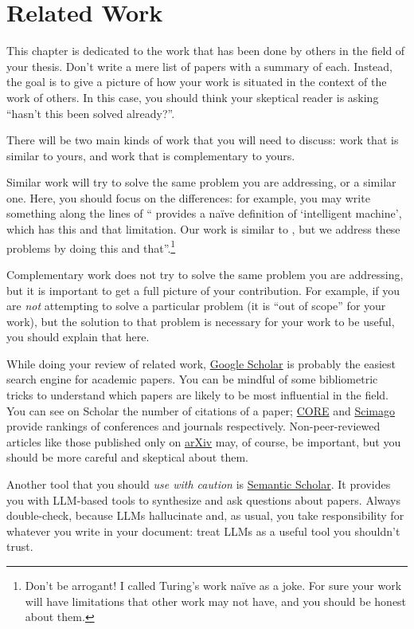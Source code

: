 \chapter{Related Work}
\label{sec:related}

This chapter is dedicated to the work that has been done by others in the field of your thesis.
Don't write a mere list of papers with a summary of each. Instead, the goal is to give a picture
of how your work is situated in the context of the work of others. In this case, you should
think your skeptical reader is asking ``hasn't this been solved already?''.

There will be two main kinds of work that you will need to discuss: work that is similar
to yours, and work that is complementary to yours.

Similar work will try to solve the same problem you are addressing, or a similar one.
Here, you should focus on the differences: for example, you may write something along the
lines of ``\textcite{DBLP:journals/x/Turing50} provides a naïve definition of
`intelligent machine', which has this and that limitation. Our work is similar to
\citeauthor{DBLP:journals/x/Turing50}, but we address these problems by doing this and
that''.\footnote{Don't be arrogant! I called Turing's work naïve as a joke.
For sure your work will have limitations that other work
may not have, and you should be honest about them.}

Complementary work does not try to solve the same problem you are addressing, but it is
important to get a full picture of your contribution. For example, if you are
\emph{not} attempting to solve a particular problem (it is ``out of scope'' for your work),
but the solution to that problem is necessary for your work to be useful, you should explain
that here.

While doing your review of related work, \href{https://scholar.google.com}{Google Scholar}
is probably the easiest search engine for academic papers. You can be mindful of some
bibliometric tricks to understand which papers are likely to be most influential in the field.
You can see on Scholar the number of citations of a paper;
\href{https://portal.core.edu.au/conf-ranks/}{CORE} and
\href{https://www.scimagojr.com}{Scimago} provide rankings of conferences and journals
respectively. Non-peer-reviewed articles like those published only on
\href{https://arxiv.org}{arXiv} may, of course, be important, but you should be more careful
and skeptical about them.

Another tool that you should \emph{use with caution} is \href{https://www.semanticscholar.org/}{Semantic Scholar}. It provides you with \ac{LLM}-based tools to synthesize and ask questions about papers. Always double-check, because \acp{LLM} hallucinate and, as usual, you take responsibility for whatever you write in your document: treat \acp{LLM} as a useful tool you shouldn't trust.

